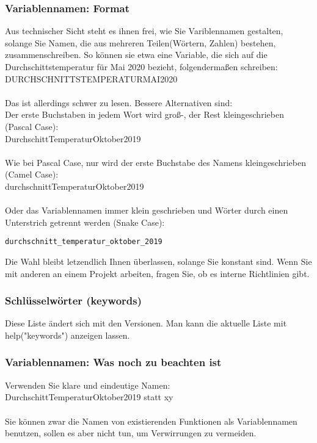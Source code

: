 \documentclass{article}
\begin{document}
\subsubsection{Variablennamen: Format}
Aus technischer Sicht steht es ihnen frei, wie Sie Variblennamen gestalten, solange Sie Namen, die aus mehreren Teilen(Wörtern, Zahlen) bestehen, zusammenschreiben. So können sie etwa eine Variable, die sich auf die Durchschittstemperatur für Mai 2020 bezieht, folgendermaßen schreiben:\\
DURCHSCHNITTSTEMPERATURMAI2020\\\\
Das ist allerdings schwer zu lesen. Bessere Alternativen sind:\\
Der erste Buchstaben in jedem Wort wird groß-, der Rest kleingeschrieben (Pascal Case):\\
DurchschittTemperaturOktober2019\\\\
Wie bei Pascal Case, nur wird der erste Buchstabe des Namens kleingeschrieben (Camel Case):\\
durchschnittTemperaturOktober2019\\\\
Oder das Variablennamen immer klein geschrieben und Wörter durch einen Unterstrich getrennt werden (Snake Case):\\
\begin{verbatim}
durchschnitt_temperatur_oktober_2019
\end{verbatim}
Die Wahl bleibt letzendlich Ihnen überlassen, solange Sie konstant sind. Wenn Sie mit anderen an einem Projekt arbeiten, fragen Sie, ob es interne Richtlinien gibt.\\
\subsubsection{Schlüsselwörter (keywords)}
Diese Liste ändert sich mit den Versionen. Man kann die aktuelle Liste mit help("keywords") anzeigen lassen.\\
\subsubsection{Variablennamen: Was noch zu beachten ist}
Verwenden Sie klare und eindeutige Namen:\\
DurchschittTemperaturOktober2019 statt xy\\\\
Sie können zwar die Namen von existierenden Funktionen als Variablennamen benutzen, sollen es aber nicht tun, um Verwirrungen zu vermeiden.\\
\end{document}
